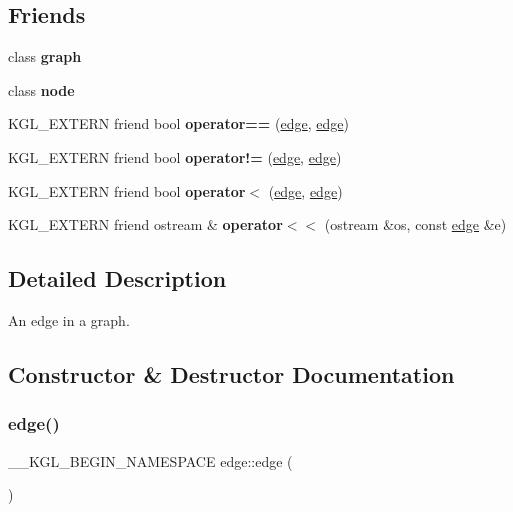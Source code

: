 \subsection*{Friends}
\begin{DoxyCompactItemize}
\item 
\mbox{\label{classedge_ab8b0dbc1b36724e5e4635ac651c218cb}} 
class {\bfseries graph}
\item 
\mbox{\label{classedge_a3700a7180235e9a28534b15d5922de12}} 
class {\bfseries node}
\item 
\mbox{\label{classedge_a5f37f74566982c3d5a9cef99e3aaee96}} 
K\+G\+L\+\_\+\+E\+X\+T\+E\+RN friend bool {\bfseries operator==} (\mbox{\hyperlink{classedge}{edge}}, \mbox{\hyperlink{classedge}{edge}})
\item 
\mbox{\label{classedge_aadb4c4480975d97b365253a6e835b4cd}} 
K\+G\+L\+\_\+\+E\+X\+T\+E\+RN friend bool {\bfseries operator!=} (\mbox{\hyperlink{classedge}{edge}}, \mbox{\hyperlink{classedge}{edge}})
\item 
\mbox{\label{classedge_af5dab224b905b68f4314b9e3749ed33a}} 
K\+G\+L\+\_\+\+E\+X\+T\+E\+RN friend bool {\bfseries operator$<$} (\mbox{\hyperlink{classedge}{edge}}, \mbox{\hyperlink{classedge}{edge}})
\item 
\mbox{\label{classedge_a624b886c3a590296dce64bd09865193e}} 
K\+G\+L\+\_\+\+E\+X\+T\+E\+RN friend ostream \& {\bfseries operator$<$$<$} (ostream \&os, const \mbox{\hyperlink{classedge}{edge}} \&e)
\end{DoxyCompactItemize}


\subsection{Detailed Description}
An edge in a graph. 

\subsection{Constructor \& Destructor Documentation}
\mbox{\label{classedge_a41859d2473a15e24255d7bc0de1f49b4}} 
\subsubsection{\texorpdfstring{edge()}{edge()}}
{\footnotesize\ttfamily \+\_\+\+\_\+\+K\+G\+L\+\_\+\+B\+E\+G\+I\+N\+\_\+\+N\+A\+M\+E\+S\+P\+A\+CE edge\+::edge (\begin{DoxyParamCaption}{ }\end{DoxyParamCaption})}

